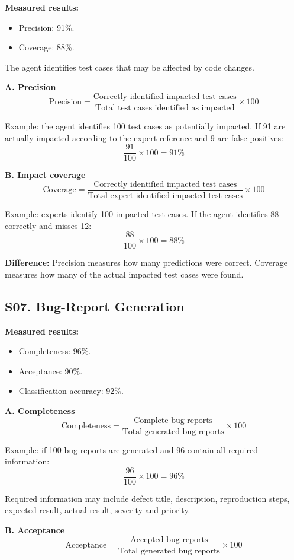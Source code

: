 \documentclass[11pt,a4paper]{article}
\begin{document}
\textbf{Measured results:}
\begin{itemize}
  \item Precision: 91\%.
  \item Coverage: 88\%.
\end{itemize}

The agent identifies test cases that may be affected by code changes.

\textbf{A. Precision}
\[
\text{Precision} =
\frac{\text{Correctly identified impacted test cases}}
     {\text{Total test cases identified as impacted}}\times 100
\]

Example: the agent identifies 100 test cases as potentially impacted. If 91 are actually impacted according to the expert reference and 9 are false positives:
\[
\frac{91}{100}\times 100=91\%
\]

\textbf{B. Impact coverage}
\[
\text{Coverage} =
\frac{\text{Correctly identified impacted test cases}}
     {\text{Total expert-identified impacted test cases}}\times 100
\]

Example: experts identify 100 impacted test cases. If the agent identifies 88 correctly and misses 12:
\[
\frac{88}{100}\times 100=88\%
\]

\textbf{Difference:} Precision measures how many predictions were correct. Coverage measures how many of the actual impacted test cases were found.

\subsection{S07. Bug-Report Generation}

\textbf{Measured results:}
\begin{itemize}
  \item Completeness: 96\%.
  \item Acceptance: 90\%.
  \item Classification accuracy: 92\%.
\end{itemize}

\textbf{A. Completeness}
\[
\text{Completeness} =
\frac{\text{Complete bug reports}}
     {\text{Total generated bug reports}}\times 100
\]

Example: if 100 bug reports are generated and 96 contain all required information:
\[
\frac{96}{100}\times 100=96\%
\]

Required information may include defect title, description, reproduction steps, expected result, actual result, severity and priority.

\textbf{B. Acceptance}
\[
\text{Acceptance} =
\frac{\text{Accepted bug reports}}
     {\text{Total generated bug reports}}\times 100
\]
\end{document}
